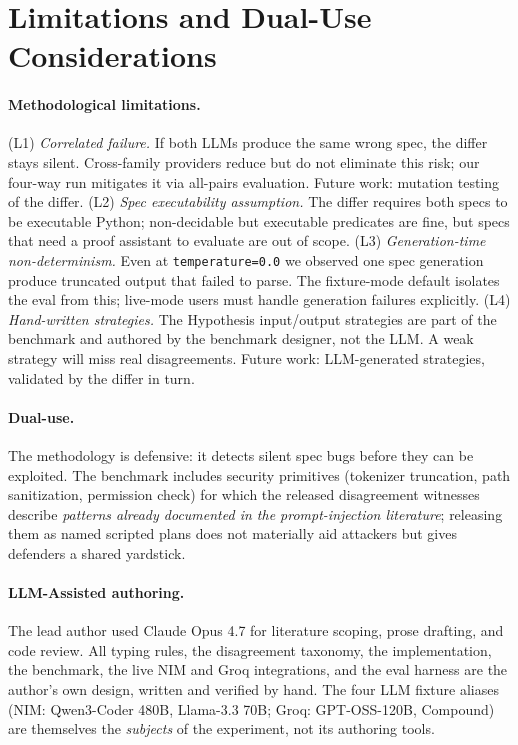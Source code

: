 \documentclass[11pt,a4paper]{article}
\begin{document}



\appendix
\section{Limitations and Dual-Use Considerations}

\paragraph{Methodological limitations.}
(L1) \emph{Correlated failure.} If both LLMs produce the same wrong
spec, the differ stays silent. Cross-family providers reduce but do
not eliminate this risk; our four-way run mitigates it via
all-pairs evaluation. Future work: mutation testing of the differ.
(L2) \emph{Spec executability assumption.} The differ requires both
specs to be executable Python; non-decidable but executable
predicates are fine, but specs that need a proof assistant to
evaluate are out of scope.
(L3) \emph{Generation-time non-determinism.} Even at
\texttt{temperature=0.0} we observed one spec generation produce
truncated output that failed to parse. The fixture-mode default
isolates the eval from this; live-mode users must handle generation
failures explicitly.
(L4) \emph{Hand-written strategies.} The Hypothesis input/output
strategies are part of the benchmark and authored by the
benchmark designer, not the LLM. A weak strategy will miss real
disagreements. Future work: LLM-generated strategies, validated by
the differ in turn.

\paragraph{Dual-use.} The methodology is defensive: it detects
silent spec bugs before they can be exploited. The benchmark
includes security primitives (tokenizer truncation, path
sanitization, permission check) for which the released disagreement
witnesses describe \emph{patterns already documented in the
prompt-injection literature}; releasing them as named scripted plans
does not materially aid attackers but gives defenders a shared
yardstick.

\paragraph{LLM-Assisted authoring.} The lead author used Claude
Opus 4.7 for literature scoping, prose drafting, and code review.
All typing rules, the disagreement taxonomy, the implementation, the
benchmark, the live NIM and Groq integrations, and the eval harness
are the author's own design, written and verified by hand. The four
LLM fixture aliases (NIM: Qwen3-Coder 480B, Llama-3.3 70B; Groq:
GPT-OSS-120B, Compound) are themselves the \emph{subjects} of the
experiment, not its authoring tools.
\end{document}
